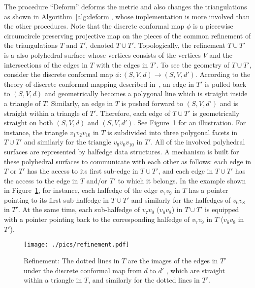 \documentclass[11pt]{article}
\begin{document}
The procedure ``Deform'' deforms the metric and also changes the triangulations as shown 
in Algorithm~\ref{alg:deform}, whose implementation is more involved than the other procedures. 
Note that the discrete conformal map $\phi$ is a piecewise circumcircle preserving projective map 
on the pieces of the common refinement of the triangulations $T$ and $T'$, denoted $T\cup T'$. 
Topologically, the refinement $T\cup T'$
is a also polyhedral surface whose vertices consists of the
vertices $V$ and the intersections of the edges in $T$
with the edges in $T'$. To see the geometry of $T\cup T'$,
consider the discrete conformal map $\phi: (S, V, d)\rightarrow (S, V, d')$.
According to the theory of discrete conformal mapping described in~\cite{glsw2},
an edge in $T'$ is pulled back to $(S, V, d)$ and geometrically
becomes a polygonal line which is straight inside a triangle of $T$. 
Similarly, an edge in $T$ is pushed forward
to $(S, V, d')$ and is straight within a triangle of $T'$. Therefore,
each edge of $T\cup T'$ is geometrically straight on both $(S, V, d)$ and $(S, V, d')$.
See Figure~\ref{fig:refinement} for an illustration. For instance, the triangle $v_1v_2v_{10}$ in
$T$ is subdivided into three polygonal facets in $T\cup T'$ and similarly
for the triangle $v_9v_0v_{10}$ in $T'$.
All of the involved polyhedral surfaces are represented by halfedge data structures.  
A mechanism is built for these polyhedral surfaces to communicate with each other as follows:
each edge in $T$ or $T'$ has the access to its first sub-edge in $T\cup T'$,
and each edge in $T\cup T'$ has the access to the edge in $T$ and/or $T'$
to which it belongs. In the example shown in Figure~\ref{fig:refinement}, for instance,
each halfedge of the edge $v_7v_9$ in $T$ has a pointer pointing to its first
sub-halfedge in $T\cup T'$ and similarly for the halfedges of $v_6v_8$ in $T'$.
At the same time, each sub-halfedge of $v_7v_9$ ($v_6v_8$) in $T\cup T'$ is equipped
with a pointer pointing back to the corresponding halfedge of $v_7v_9$ in $T$
($v_6v_8$ in $T'$).

\begin{figure}[!t]
\centering
\texttt{[image: ./pics/refinement.pdf]}
\vspace{0.1in}
\caption{Refinement: The dotted lines in $T$  are the images
of the edges in $T'$ under the discrete conformal map from $d$ to $d'$ ,
which are straight within a triangle in $T$, and similarly for the dotted lines in $T'$.
}
\label{fig:refinement}
\end{figure}
\end{document}
